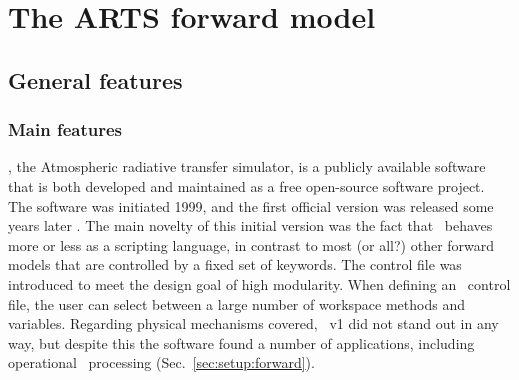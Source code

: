 \chapter{The ARTS forward model}
\label{chapter:arts}


\section{General features}
\label{sec:arts:features}

\subsection{Main features}
%
\ARTS, the Atmospheric radiative transfer simulator, is a publicly available
software that is both developed and maintained as a free open-source software
project. The software was initiated 1999, and the first official version was
released some years later \citep{buehler:artst:05}. The main novelty of this
initial version was the fact that \ARTS\ behaves more or less as a scripting
language, in contrast to most (or all?) other forward models that are
controlled by a fixed set of keywords. The control file was introduced to meet
the design goal of high modularity. When defining an \ARTS\ control file, the
user can select between a large number of workspace methods and variables.
Regarding physical mechanisms covered, \ARTS~v1 did not stand out in any way,
but despite this the software found a number of applications, including
operational \SMR\ processing (Sec.~\ref{sec:setup:forward}).

